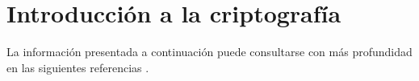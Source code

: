 %
%

\section{Introducción a la criptografía}

La información presentada a continuación puede consultarse con más profundidad
en las siguientes referencias
\cite{menezes, DBLP:series/isc/DelfsK07}.






